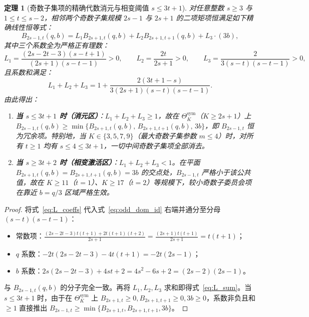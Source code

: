 \documentclass[11pt,a4paper]{article}
\newtheorem{theorem}{定理}[section]
\theoremstyle{definition}
\theoremstyle{remark}
\newcommand{\Thetasym}{\Theta^{\mathrm{sym}}_K}
\begin{document}
\begin{theorem}[奇数子集项的精确代数消元与相变阈值 $s \le 3t + 1$]\label{thm:odd_dom}
对任意整数 $s \ge 3$ 与 $1 \le t \le s - 2$，相邻两个奇数子集规模 $2s-1$ 与 $2s+1$ 的二项矩项恒满足如下精确线性恒等式：
\begin{equation}\label{eq:odd_dom_id}
  \boxed{B_{2s-1, t}(q, b) = L_1 B_{2s+1, t}(q, b) + L_2 B_{2s+1, t+1}(q, b) + L_3 \cdot (3b),}
\end{equation}
其中三个系数全为严格正有理数：
\begin{equation}\label{eq:L_coeffs}
  L_1 = \frac{(2s - 2t - 3)(s - t + 1)}{(2s + 1)(s - t - 1)} > 0, \qquad
  L_2 = \frac{2t}{2s + 1} > 0, \qquad
  L_3 = \frac{2}{3(s - t)(s - t - 1)} > 0,
\end{equation}
且系数和满足：
\begin{equation}\label{eq:L_sum}
  L_1 + L_2 + L_3 = 1 + \frac{2(3t + 1 - s)}{3(2s + 1)(s - t)(s - t - 1)}.
\end{equation}
由此得出：
\begin{enumerate}
  \setlength{\itemsep}{2pt}\setlength{\parskip}{0pt}
  \item \textbf{当 $s \le 3t + 1$ 时（消元区）}：$L_1 + L_2 + L_3 \ge 1$，故在 $\Thetasym$（$K \ge 2s+1$）上 $B_{2s-1, t}(q, b) \ge \min\bigl\{B_{2s+1, t}(q, b),\, B_{2s+1, t+1}(q, b),\, 3b\bigr\}$，即 $B_{2s-1, t}$ 恒为冗余项。特别地，当 $K \in \{3, 5, 7, 9\}$（最大奇数子集参数 $m \le 4$）时，对所有 $t \ge 1$ 均有 $s \le 4 \le 3t + 1$，一切中间奇数子集项全部消去。
  \item \textbf{当 $s \ge 3t + 2$ 时（相变激活区）}：$L_1 + L_2 + L_3 < 1$。在平面 $B_{2s+1, t}(q,b) = B_{2s+1, t+1}(q,b) = 3b$ 的交点处，$B_{2s-1, t}$ 严格小于该公共值，故在 $K \ge 11$（$t=1$）、$K \ge 17$（$t=2$）等规模下，较小奇数子委员会项在靠近 $b = q/3$ 区域严格生效。
\end{enumerate}
\end{theorem}
\begin{proof}
将式~\eqref{eq:L_coeffs} 代入式~\eqref{eq:odd_dom_id} 右端并通分至分母 $(s-t)(s-t-1)$：
\begin{itemize}
  \setlength{\itemsep}{1pt}\setlength{\parskip}{0pt}
  \item 常数项：$\frac{(2s-2t-3)t(t+1) + 2t(t+1)(t+2)}{2s+1} = \frac{(2s+1)t(t+1)}{2s+1} = t(t+1)$；
  \item $q$ 系数：$-2t(2s-2t-3) - 4t(t+1) = -2t(2s - 1)$；
  \item $b$ 系数：$2s(2s-2t-3) + 4st + 2 = 4s^2 - 6s + 2 = (2s-2)(2s-1)$。
\end{itemize}
与 $B_{2s-1, t}(q, b)$ 的分子完全一致。再将 $L_1, L_2, L_3$ 求和即得式~\eqref{eq:L_sum}。当 $s \le 3t+1$ 时，由于在 $\Thetasym$ 上 $B_{2s+1, t} \ge 0, B_{2s+1, t+1} \ge 0, 3b \ge 0$，系数非负且和 $\ge 1$ 直接推出 $B_{2s-1, t} \ge \min\{B_{2s+1, t}, B_{2s+1, t+1}, 3b\}$。
\end{proof}
\end{document}
